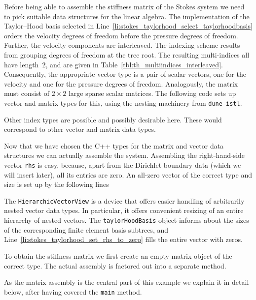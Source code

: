 \documentclass[a4paper,10pt,headings=normal,bibliography=totoc]{scrartcl}
\newcommand{\cpp}[1]{\lstinline[basicstyle=\ttfamily]!#1!}
\newcommand{\dunemodule}[1]{\texttt{#1}}
\begin{document}
Before being able to assemble the stiffness matrix of the Stokes system we need to pick suitable data structures
for the linear algebra.
The implementation of the Taylor--Hood basis selected in Line~\ref{li:stokes_taylorhood_select_taylorhoodbasis} orders the
velocity degrees of freedom before the pressure degrees of freedom.  Further, the velocity
components are interleaved.  The indexing scheme results from grouping degrees of freedom at the
tree root.  The resulting multi-indices all have length~2, and are given in Table~\ref{tbl:th_multiindices_interleaved}.
Consequently, the appropriate vector type is a pair of scalar vectors, one for the velocity and one for the pressure
degrees of freedom.  Analogously, the matrix must consist of $2 \times 2$ large sparse scalar matrices.
The following code sets up vector and matrix types for this, using the nesting machinery from \dunemodule{dune-istl}.
%

%
Other index types are possible and possibly desirable here.  These would correspond to other vector and
matrix data types.

Now that we have chosen the C++ types for the matrix and vector data structures we can actually assemble the system.
Assembling the right-hand-side vector \cpp{rhs} is easy, because, apart from the Dirichlet boundary data (which we
will insert later), all its entries are zero.  An all-zero vector of the correct type and size is set up by the
following lines
%

%
The \cpp{HierarchicVectorView} is a device that offers easier handling of arbitrarily nested vector data types.
In particular, it offers convenient resizing of an entire hierarchy of nested vectors.
The \cpp{taylorHoodBasis} object informs about the sizes of the corresponding finite element basis subtrees,
and Line~\ref{li:stokes_taylorhood_set_rhs_to_zero} fills the entire vector with zeros.

To obtain the stiffness matrix we first create an empty matrix object of the correct type.  The actual assembly
is factored out into a separate method.
%

%
As the matrix assembly is the central part of this example we explain it in detail below, after having covered the \cpp{main} method.
\end{document}
